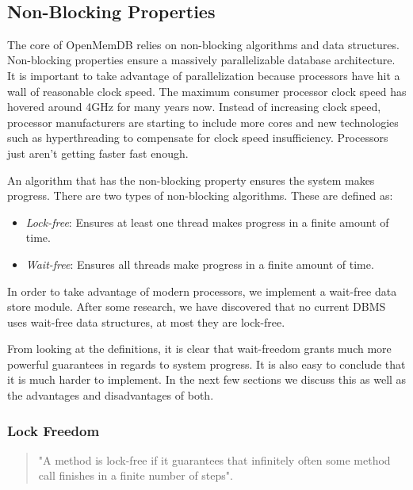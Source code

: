 \documentclass[letterpaper, 12pt]{article}
\begin{document}
\
\newpage
\subsection{Non-Blocking Properties}
The core of OpenMemDB relies on non-blocking algorithms and data structures. Non-blocking properties ensure a massively parallelizable database architecture. It is important to take advantage of parallelization because processors have hit a wall of reasonable clock speed\citep{processorspeed}. The maximum consumer processor clock speed has hovered around 4GHz for many years now. Instead of increasing clock speed, processor manufacturers are starting to include more cores and new technologies such as hyperthreading to compensate for clock speed insufficiency. Processors just aren't getting faster fast enough.
\par\vspace{\baselineskip}
An algorithm that has the non-blocking property ensures the system makes progress. There are two types of non-blocking algorithms. These are defined as: 
\begin{itemize}
	\item \textit{Lock-free}: Ensures at least one thread makes progress in a finite amount of time.
	\item \textit{Wait-free}: Ensures all threads make progress in a finite amount of time. 
\end{itemize}
In order to take advantage of modern processors, we implement a wait-free data store module. After some research, we have discovered that no current DBMS uses wait-free data structures, at most they are lock-free.
\par\vspace{\baselineskip}
From looking at the definitions, it is clear that wait-freedom grants much more powerful guarantees in regards to system progress. It is also easy to conclude that it is much harder to implement. In the next few sections we discuss this as well as the advantages and disadvantages of both. 

\subsubsection{Lock Freedom}
\begin{quotation}
	"A method is lock-free if it guarantees that infinitely often some method call finishes in a finite number of steps"\citep[p. 60]{artofmulti}.
\end{quotation}
\end{document}
